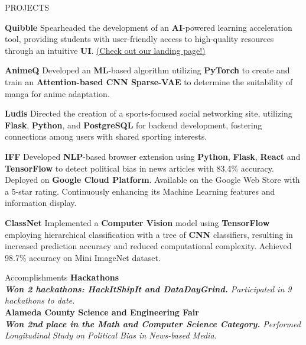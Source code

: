 \documentclass{resume} %
\begin{document}
\begin{rSection}{PROJECTS}
\vspace{-1em}


\item \textbf{Quibble} {Spearheaded the development of an \textbf{AI}-powered learning acceleration tool, providing students with user-friendly access to high-quality resources through an intuitive \textbf{UI}.} \href{https://quibble.webflow.io/}{(Check out our landing page!)}


\vspace{-1.75mm}


\item \textbf{AnimeQ} {Developed an \textbf{ML}-based algorithm utilizing \textbf{PyTorch} to create and train an \textbf{Attention-based CNN Sparse-VAE} to determine the suitability of manga for anime adaptation.}


\vspace{-1.75mm}


\item \textbf{Ludis} {Directed the creation of a sports-focused social networking site, utilizing \textbf{Flask}, \textbf{Python}, and \textbf{PostgreSQL} for backend development, fostering connections among users with shared sporting interests.}


\vspace{-1.75mm}


\item \textbf{IFF} {Developed \textbf{NLP}-based browser extension using \textbf{Python}, \textbf{Flask}, \textbf{React} and \textbf{TensorFlow} to detect political bias in news articles with 83.4\% accuracy. Deployed on \textbf{Google Cloud Platform}. Available on the Google Web Store with a 5-star rating. Continuously enhancing its Machine Learning features and information display.}


\vspace{-1.75mm}


\item \textbf{ClassNet} {Implemented a \textbf{Computer Vision} model using \textbf{TensorFlow} employing hierarchical classification with a tree of \textbf{CNN} classifiers, resulting in increased prediction accuracy and reduced computational complexity. Achieved 98.7\% accuracy on Mini ImageNet dataset.}


\end{rSection} 


\begin{rSection}{Accomplishments} 
\textbf{Hackathons}\\
\textit{\textbf{Won 2 hackathons: HackItShipIt and DataDayGrind.} Participated in 9 hackathons to date. } \\
\textbf{Alameda County Science and Engineering Fair}\\
\textit{\textbf{Won 2nd place in the Math and Computer Science Category.} Performed Longitudinal Study on Political Bias in News-based Media.}

\end{rSection}
\end{document}
